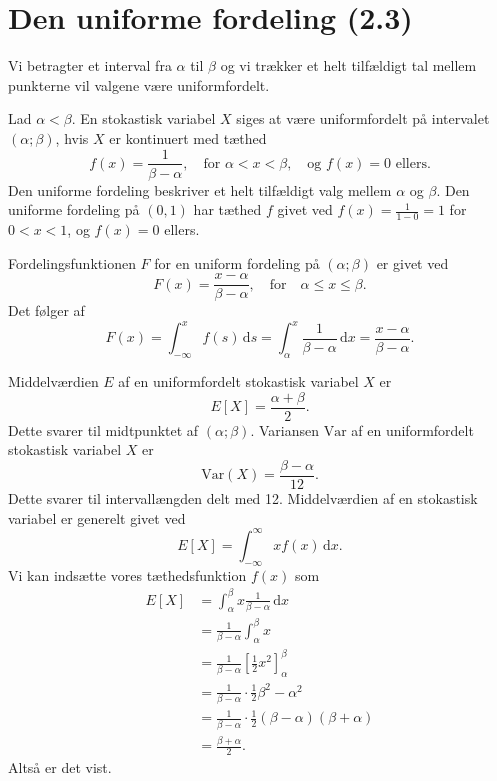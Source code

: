 
\section{Den uniforme fordeling (2.3)} \label{afs:foruni}
Vi betragter et interval fra $\alpha$ til $\beta$ og vi trækker et helt tilfældigt tal mellem punkterne vil valgene være uniformfordelt.
\begin{definition} 
  Lad $\alpha < \beta$. En stokastisk variabel $X$ siges at være uniformfordelt på intervalet $(\alpha; \beta)$, hvis $X$ er kontinuert med tæthed
  \[ 
  f(x) = \frac{1}{\beta - \alpha}, \quad \text{for } \alpha < x < \beta, \quad \text{og } f(x) = 0 \text{ ellers}
  .\]
  Den uniforme fordeling beskriver et helt tilfældigt valg mellem $\alpha$ og $\beta$. Den uniforme fordeling på $(0, 1)$ har tæthed $f$ givet ved $f(x) = \frac{1}{1-0} =1$ for $0 < x <1$, og $f(x) = 0$ ellers.
\end{definition}

\begin{sæt} 
  Fordelingsfunktionen $F$ for en uniform fordeling på $(\alpha; \beta)$ er givet ved
  \[ 
  F(x) = \frac{x-\alpha}{\beta - \alpha}, \quad \text{for} \quad \alpha \leq x \leq \beta
  .\]
  Det følger af
  \[ 
  F(x) = \int_{-\infty}^{x} f(s) \, \mathrm{d}s = \int_{\alpha}^{x} \frac{1}{\beta - \alpha} \, \mathrm{d}x = \frac{x - \alpha}{\beta - \alpha}
  .\]
\end{sæt}

\begin{sæt} 
  Middelværdien $E$ af en uniformfordelt stokastisk variabel $X$ er
  \[ 
    E[X] = \frac{\alpha + \beta}{2}
  .\]
  Dette svarer til midtpunktet af $(\alpha; \beta)$.
  \bigbreak
  Variansen $\mathrm{Var}$ af en uniformfordelt stokastisk variabel $X$ er
  \[ 
  \mathrm{Var}(X) = \frac{\beta - \alpha}{12}
  .\]
  Dette svarer til intervallængden delt med 12.
  \tcblower
  Middelværdien af en stokastisk variabel er generelt givet ved
  \[ 
    E[X] = \int_{-\infty}^{\infty} x f(x) \, \mathrm{d}x 
  .\]
  Vi kan indsætte vores tæthedsfunktion $f(x)$ som
  \begin{align*}
    E[X] &= \int_{\alpha}^{\beta} x \frac{1}{\beta - \alpha} \, \mathrm{d}x \\
    &= \frac{1}{\beta - \alpha} \int_{\alpha}^{\beta} x \\
    &= \frac{1}{\beta - \alpha} \left[ \frac{1}{2}x^2 \right]_{\alpha}^{\beta} \\
    &= \frac{1}{\beta - \alpha} \cdot \frac{1}{2} \beta^2 - \alpha^2 \\
    &= \frac{1}{\beta - \alpha} \cdot \frac{1}{2}(\beta - \alpha)(\beta + \alpha) \\
    &= \frac{\beta + \alpha}{2}
  .\end{align*}
  Altså er det vist.
\end{sæt}


